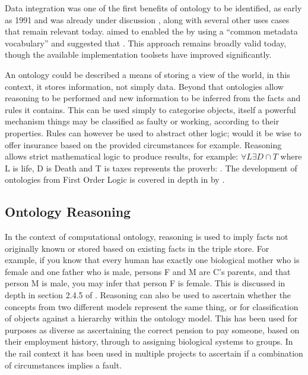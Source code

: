 Data integration was one of the first benefits of ontology to be identified, as early as 1991 and was already under discussion \citep{Siegel1991}, along with several other uses cases that remain relevant today. \citet{Siegel1991} aimed to enabled the  by using a ``common metadata vocabulary'' and suggested that . This approach remains broadly valid today, though the available implementation toolsets have improved significantly. 

An ontology could be described a means of storing a view of the world, in this context, it stores information, not simply data. Beyond that ontologies allow reasoning to be performed and new information to be inferred from the facts and rules it contains. This can be used simply to categorise objects, itself a powerful mechanism \eg things may be classified as faulty or working, according to their properties. Rules can however be used to abstract other logic; would it be wise to offer insurance based on the provided circumstances for example. Reasoning allows strict mathematical logic to produce results, for example: \(\forall L \exists D \cap T \) where L is life, D is Death and T is taxes represents the proverb: . The development of ontologies from First Order Logic is covered in depth in by \citet{baader_calvanese_mcguinness_nardi_patel-schneider_2007}.

\subsection{Ontology Reasoning}
In the context of computational ontology, reasoning is used to imply facts not originally known or stored based on existing facts in the triple store. For example, if you know that every human has exactly one biological mother who is female and one father who is male, persons F and M are C's parents, and that person M is male, you may infer that person F is female.  This is discussed in depth in section 2.4.5 of \citet{Tutcher2015}. Reasoning can also be used to ascertain whether the concepts from two different models represent the same thing, or for classification of objects against a hierarchy within the ontology model. This has been used for purposes as diverse as ascertaining the correct pension to pay someone, based on their employment history, through to assigning biological systems to groups. In the rail context it has been used in multiple projects to ascertain if a combination of circumstances implies a fault.


